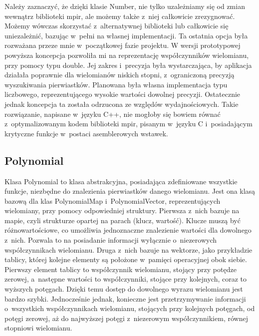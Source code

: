 Należy zaznaczyć, że dzięki klasie Number, nie tylko uzależniamy się od zmian wewnątrz biblioteki mpir, ale możemy także z~niej całkowicie zrezygnować. Możemy wówczas skorzystać z~alternatywnej biblioteki lub całkowicie się uniezależnić, bazując w~pełni na własnej implementacji. Ta ostatnia opcja była rozważana przeze mnie w~początkowej fazie projektu. W wersji prototypowej powyższa koncepcja pozwoliła mi na reprezentację współczynników wielomianu, przy pomocy typu double. Jej zakres i~precyzja była wystarczająca, by aplikacja działała poprawnie dla wielomianów niskich stopni, z~ograniczoną precyzją wyszukiwania pierwiastków. Planowana była własna implementacja typu liczbowego, reprezentującego wysokie wartości dowolnej precyzji. Ostatecznie jednak koncepcja ta została odrzucona ze względów wydajnościowych. Takie rozwiązanie, napisane w~języku C++, nie mogłoby się bowiem równać z~optymalizowanym kodem biblioteki mpir, pisanym w~języku C i~posiadającym krytyczne funkcje w~postaci asemblerowych wstawek.

\subsection{Polynomial}

Klasa Polynomial to klasa abstrakcyjna, posiadająca zdefiniowane wszystkie funkcje, niezbędne do znalezienia pierwiastków danego wielomianu. Jest ona klasą bazową dla klas PolynomialMap i~PolynomialVector, reprezentujących wielomiany, przy pomocy odpowiedniej struktury. Pierwsza z~nich bazuje na mapie, czyli strukturze opartej na parach (klucz, wartość). Klucze muszą być różnowartościowe, co umożliwia jednoznaczne znalezienie wartości dla dowolnego z~nich. Pozwala to na posiadanie informacji wyłącznie o~niezerowych współczynnikach wielomianu. Druga z~nich bazuje na wektorze, jako przykładzie tablicy, której kolejne elementy są położone w~pamięci operacyjnej obok siebie. Pierwszy element tablicy to współczynnik wielomianu, stojący przy potędze zerowej, a~następne wartości to współczynniki, stojące przy kolejnych, coraz to wyższych potęgach. Dzięki temu dostęp do dowolnego wyrazu wielomianu jest bardzo szybki. Jednocześnie jednak, konieczne jest przetrzymywanie informacji o~wszystkich współczynnikach wielomianu, stojących przy kolejnych potęgach, od potęgi zerowej, aż do najwyższej potęgi z~niezerowym współczynnikiem, równej stopniowi wielomianu.

